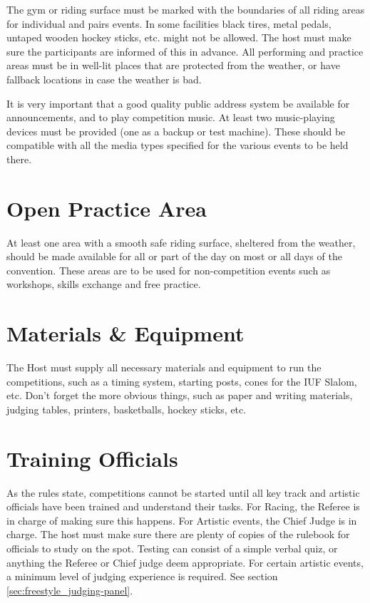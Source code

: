 The gym or riding surface must be marked with the boundaries of all riding areas for individual and pairs events.
In some facilities black tires, metal pedals, untaped wooden hockey sticks, etc.
might not be allowed.
The host must make sure the participants are informed of this in advance.
All performing and practice areas must be in well-lit places that are protected from the weather, or have fallback locations in case the weather is bad.

It is very important that a good quality public address system be available for announcements, and to play competition music.
At least two music-playing devices must be provided (one as a backup or test machine).
These should be compatible with all the media types specified for the various events to be held there.

\section{Open Practice Area}
At least one area with a smooth safe riding surface, sheltered from the weather, should be made available for all or part of the day on most or all days of the convention.
These areas are to be used for non-competition events such as workshops, skills exchange and free practice.

\section{Materials \& Equipment}
The Host must supply all necessary materials and equipment to run the competitions, such as a timing system, starting posts, cones for the IUF Slalom, etc.
Don't forget the more obvious things, such as paper and writing materials, judging tables, printers, basketballs, hockey sticks, etc.

\section{Training Officials}
As the rules state, competitions cannot be started until all key track and artistic officials have been trained and understand their tasks.
For Racing, the Referee is in charge of making sure this happens.
For Artistic events, the Chief Judge is in charge.
The host must make sure there are plenty of copies of the rulebook for officials to study on the spot.
Testing can consist of a simple verbal quiz, or anything the Referee or Chief judge deem appropriate.
For certain artistic events, a minimum level of judging experience is required.
See section \ref{sec:freestyle_judging-panel}.

